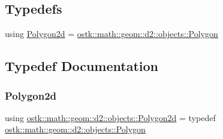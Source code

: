\subsection*{Typedefs}
\begin{DoxyCompactItemize}
\item 
using \hyperlink{namespaceostk_1_1math_1_1geom_1_1d2_1_1objects_a5786a3021d23f9c64937e263a2da9d27}{Polygon2d} = \hyperlink{classostk_1_1math_1_1geom_1_1d2_1_1objects_1_1_polygon}{ostk\+::math\+::geom\+::d2\+::objects\+::\+Polygon}
\end{DoxyCompactItemize}


\subsection{Typedef Documentation}
\mbox{\label{namespaceostk_1_1math_1_1geom_1_1d2_1_1objects_a5786a3021d23f9c64937e263a2da9d27}} 
\subsubsection{\texorpdfstring{Polygon2d}{Polygon2d}}
{\footnotesize\ttfamily using \hyperlink{namespaceostk_1_1math_1_1geom_1_1d2_1_1objects_a5786a3021d23f9c64937e263a2da9d27}{ostk\+::math\+::geom\+::d2\+::objects\+::\+Polygon2d} = typedef \hyperlink{classostk_1_1math_1_1geom_1_1d2_1_1objects_1_1_polygon}{ostk\+::math\+::geom\+::d2\+::objects\+::\+Polygon}}

